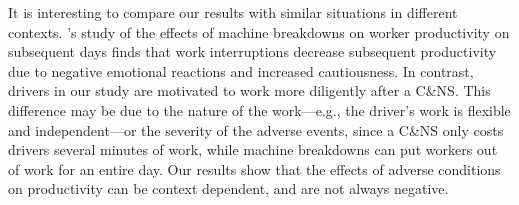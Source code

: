 \documentclass[reviewmode]{restat}
\begin{document}
It is interesting to compare our results with similar situations in different contexts. 
\citeauthor{cai2017recover}'s \citeyear{cai2017recover} study of the effects of  machine breakdowns on worker 
productivity on subsequent days finds that work interruptions decrease subsequent productivity due to
negative emotional reactions and increased cautiousness. In contrast, drivers in our study are motivated 
to work more diligently after a C\&NS. This difference may be due to the nature of the work---e.g., the 
driver's work is flexible and independent---or the severity of the adverse events, since a C\&NS only costs
drivers several minutes of work, while machine breakdowns can put workers out of work for an entire day.
Our results show that the %
effects of adverse conditions on productivity can be context dependent,
and are not always negative.

\end{document}
